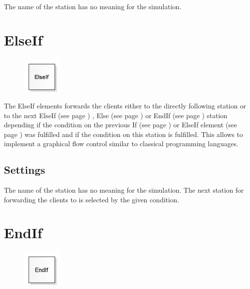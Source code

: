 The name of the station has no meaning for the simulation.


\section{ElseIf}
\label{ref:ModelElementLogicElseIf}

\begin{figure}
\vspace{-22pt}
\includegraphics[width=2cm]{imageModelElementLogicElseIf.png}
\vspace{-22pt}
\end{figure}

The ElseIf elements forwards the clients either to the directly following station or to the
next ElseIf (see page \pageref{ref:ModelElementLogicElseIf}) ,
Else (see page \pageref{ref:ModelElementLogicElse}) or
EndIf (see page \pageref{ref:ModelElementLogicEndIf}) station depending if the condition
on the previous If (see page \pageref{ref:ModelElementLogicIf}) or
ElseIf element (see page \pageref{ref:ModelElementLogicElseIf}) was fulfilled and if the
condition on this station is fulfilled.
This allows to implement a graphical flow control similar to classical programming
languages.	

\subsection*{Settings}

The name of the station has no meaning for the simulation.
The next station for forwarding the clients to is selected by the given condition.


\section{EndIf}
\label{ref:ModelElementLogicEndIf}

\begin{figure}
\vspace{-22pt}
\includegraphics[width=2cm]{imageModelElementLogicEndIf.png}
\vspace{-22pt}
\end{figure}

